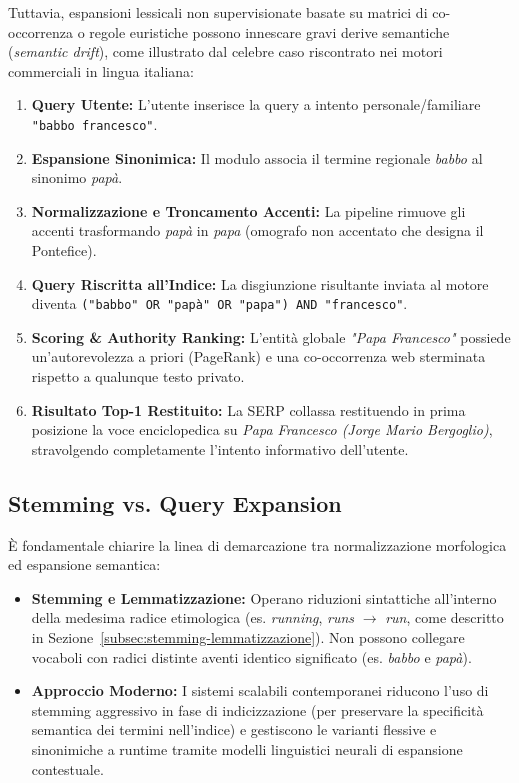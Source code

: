 Tuttavia, espansioni lessicali non supervisionate basate su matrici di co-occorrenza o regole euristiche possono innescare gravi derive semantiche (\textit{semantic drift}), come illustrato dal celebre caso riscontrato nei motori commerciali in lingua italiana:
\begin{enumerate}
    \item \textbf{Query Utente:} L'utente inserisce la query a intento personale/familiare \texttt{"babbo francesco"}.
    \item \textbf{Espansione Sinonimica:} Il modulo associa il termine regionale \textit{babbo} al sinonimo \textit{pap\`a}.
    \item \textbf{Normalizzazione e Troncamento Accenti:} La pipeline rimuove gli accenti trasformando \textit{pap\`a} in \textit{papa} (omografo non accentato che designa il Pontefice).
    \item \textbf{Query Riscritta all'Indice:} La disgiunzione risultante inviata al motore diventa \texttt{("babbo" OR "pap\`a" OR "papa") AND "francesco"}.
    \item \textbf{Scoring \& Authority Ranking:} L'entit\`a globale \textit{"Papa Francesco"} possiede un'autorevolezza a priori (PageRank) e una co-occorrenza web sterminata rispetto a qualunque testo privato.
    \item \textbf{Risultato Top-1 Restituito:} La SERP collassa restituendo in prima posizione la voce enciclopedica su \textit{Papa Francesco (Jorge Mario Bergoglio)}, stravolgendo completamente l'intento informativo dell'utente.
\end{enumerate}

\FloatBarrier
\subsection{Stemming vs. Query Expansion}
\label{subsec:stemming-vs-expansion}
\`E fondamentale chiarire la linea di demarcazione tra normalizzazione morfologica ed espansione semantica:
\begin{itemize}
    \item \textbf{Stemming e Lemmatizzazione:} Operano riduzioni sintattiche all'interno della medesima radice etimologica (es. \textit{running}, \textit{runs} $\to$ \textit{run}, come descritto in Sezione~\ref{subsec:stemming-lemmatizzazione}). Non possono collegare vocaboli con radici distinte aventi identico significato (es. \textit{babbo} e \textit{pap\`a}).
    \item \textbf{Approccio Moderno:} I sistemi scalabili contemporanei riducono l'uso di stemming aggressivo in fase di indicizzazione (per preservare la specificit\`a semantica dei termini nell'indice) e gestiscono le varianti flessive e sinonimiche a runtime tramite modelli linguistici neurali di espansione contestuale.
\end{itemize}

